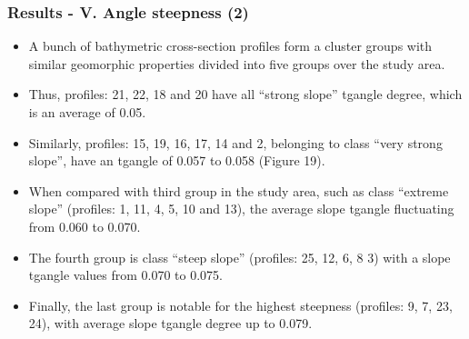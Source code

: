 \documentclass[pdflatex,compress,8pt,
	xcolor={dvipsnames,dvipsnames,svgnames,x11names,table},
	hyperref={colorlinks = true,breaklinks = true, urlcolor = NavyBlue, breaklinks = true}]{beamer}
\begin{document}
\begin{frame}\frametitle{Results - V. Angle steepness (2)}	

	\begin{itemize}
		 \item A bunch of bathymetric cross-section profiles form a cluster groups with similar geomorphic properties divided into five groups over the study area. 
		 \item Thus, profiles: 21, 22, 18 and 20 have all “strong slope” tg\degree angle degree, which is an average of 0.05. 
		 \item Similarly, profiles: 15, 19, 16, 17, 14 and 2, belonging to class “very strong slope”, have an tg\degree angle of 0.057 to 0.058 (Figure 19). 
		 \item When compared with third group in the study area, such as class “extreme slope” (profiles: 1, 11, 4, 5, 10 and 13), the average slope tg\degree angle fluctuating from 0.060 to 0.070. 
		 \item The fourth group is class “steep slope” (profiles: 25, 12, 6, 8 3) with a slope tg\degree angle values from 0.070 to 0.075. 
		 \item Finally, the last group is notable for the highest steepness (profiles: 9, 7, 23, 24), with average slope tg\degree angle degree up to 0.079. 
	\end{itemize}		 
\end{frame}


\end{document}
